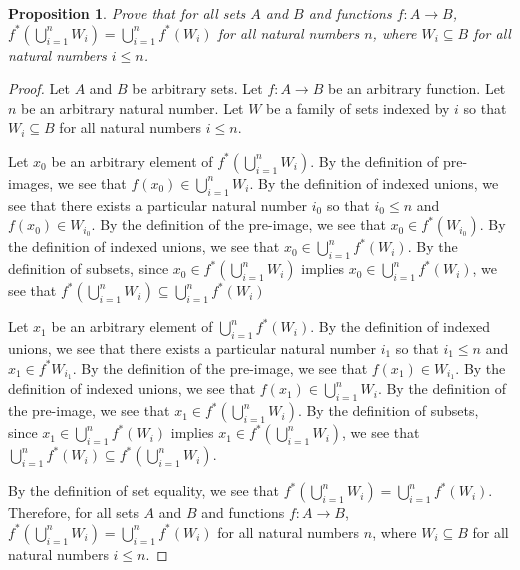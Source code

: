 \documentclass{amsart}
\newtheorem*{proposition}{Proposition}
\newcommand{\pimg}{^{*}}
\numberwithin{equation}{section}
\begin{document}
	\begin{problem}[manual-num=61]
		\begin{proposition}
			Prove that for all sets $A$ and $B$ and functions $f : A \rightarrow B$, $f \pimg (\bigcup_{i=1}^{n} W_i) =\bigcup_{i=1}^{n} f \pimg (W_i)$ for all natural numbers $n$, where $W_i \subseteq B$ for all natural numbers $i \leq n$.
		\end{proposition}

		\begin{proof}
			Let $A$ and $B$ be arbitrary sets.
			Let $f : A \rightarrow B$ be an arbitrary function.
			Let $n$ be an arbitrary natural number.
			Let $W$ be a family of sets indexed by $i$ so that $W_i \subseteq B$ for all natural numbers $i \leq n$.

			Let $x_0$ be an arbitrary element of $f \pimg (\bigcup_{i=1}^{n} W_i)$.
			By the definition of pre-images, we see that $f(x_0) \in \bigcup_{i=1}^{n} W_i$.
			By the definition of indexed unions, we see that there exists a particular natural number $i_0$ so that $i_0 \leq n$ and $f(x_0) \in W_{i_0}$.
			By the definition of the pre-image, we see that $x_0 \in f \pimg (W_{i_0})$.
			By the definition of indexed unions, we see that $x_0 \in \bigcup_{i=1}^{n} f \pimg (W_i)$.
			By the definition of subsets, since $x_0 \in f \pimg (\bigcup_{i=1}^{n} W_i)$ implies $x_0 \in \bigcup_{i=1}^{n} f \pimg (W_i)$, we see that $f \pimg (\bigcup_{i=1}^{n} W_i) \subseteq \bigcup_{i=1}^{n} f \pimg (W_i)$

			Let $x_1$ be an arbitrary element of $\bigcup_{i=1}^{n} f \pimg (W_i)$.
			By the definition of indexed unions, we see that there exists a particular natural number $i_1$ so that $i_1 \leq n$ and $x_1 \in f \pimg W_{i_1}$.
			By the definition of the pre-image, we see that $f(x_1) \in W_{i_1}$.
			By the definition of indexed unions, we see that $f(x_1) \in \bigcup_{i=1}^{n} W_i$.
			By the definition of the pre-image, we see that $x_1 \in f \pimg (\bigcup_{i=1}^{n} W_i)$.
			By the definition of subsets, since $x_1 \in \bigcup_{i=1}^{n} f \pimg (W_i)$ implies $x_1 \in f \pimg (\bigcup_{i=1}^{n} W_i)$, we see that $\bigcup_{i=1}^{n} f \pimg (W_i) \subseteq f \pimg (\bigcup_{i=1}^{n} W_i)$.

			By the definition of set equality, we see that $f \pimg (\bigcup_{i=1}^{n} W_i) = \bigcup_{i=1}^{n} f \pimg (W_i)$.
			Therefore, for all sets $A$ and $B$ and functions $f : A \rightarrow B$, $f \pimg (\bigcup_{i=1}^{n} W_i) =\bigcup_{i=1}^{n} f \pimg (W_i)$ for all natural numbers $n$, where $W_i \subseteq B$ for all natural numbers $i \leq n$.
		\end{proof}
	\end{problem}
\end{document}
